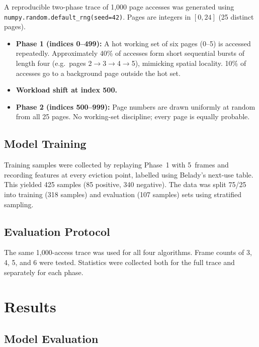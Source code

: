 \documentclass[12pt,a4paper]{article}
\begin{document}
A reproducible two-phase trace of 1{,}000 page accesses was generated using
\texttt{numpy.random.default\_rng(seed=42)}. Pages are integers in
$[0, 24]$ (25 distinct pages).

\begin{itemize}
  \item \textbf{Phase 1 (indices 0--499):} A hot working set of six pages
        (0--5) is accessed repeatedly. Approximately 40\% of accesses form
        short sequential bursts of length four (e.g.\ pages 2$\to$3$\to$4$\to$5),
        mimicking spatial locality. 10\% of accesses go to a background
        page outside the hot set.
  \item \textbf{Workload shift at index 500.}
  \item \textbf{Phase 2 (indices 500--999):} Page numbers are drawn
        uniformly at random from all 25 pages. No working-set discipline;
        every page is equally probable.
\end{itemize}

\subsection{Model Training}

Training samples were collected by replaying Phase~1 with 5~frames and
recording features at every eviction point, labelled using Belady's
next-use table. This yielded 425 samples (85 positive, 340 negative).
The data was split 75/25 into training (318 samples) and evaluation
(107 samples) sets using stratified sampling.

\subsection{Evaluation Protocol}

The same 1{,}000-access trace was used for all four algorithms.
Frame counts of 3, 4, 5, and 6 were tested. Statistics were collected
both for the full trace and separately for each phase.

\section{Results}

\subsection{Model Evaluation}
\end{document}
